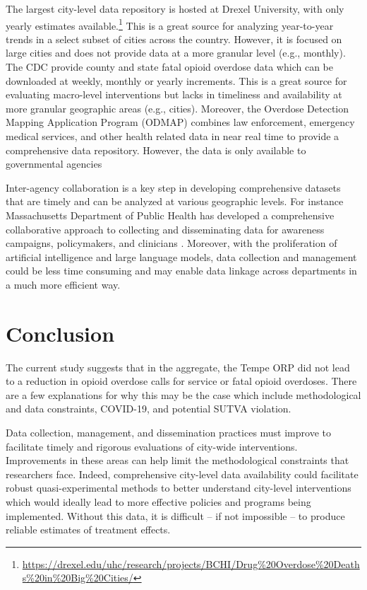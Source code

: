 The largest city-level data repository is hosted at Drexel University, with only yearly estimates available.\footnote{\url{https://drexel.edu/uhc/research/projects/BCHI/Drug\%20Overdose\%20Deaths\%20in\%20Big\%20Cities/}} This is a great source for analyzing year-to-year trends in a select subset of cities across the country. However, it is focused on large cities and does not provide data at a more granular level (e.g., monthly). The CDC provide county and state fatal opioid overdose data which can be downloaded at weekly, monthly or yearly increments. This is a great source for evaluating macro-level interventions but lacks in timeliness and availability at more granular geographic areas (e.g., cities). Moreover, the Overdose Detection Mapping Application Program (ODMAP) combines law enforcement, emergency medical services, and other health related data in near real time to provide a comprehensive data repository. However, the data is only available to governmental agencies \parencite{blanco_data_2022}

Inter-agency collaboration is a key step in developing comprehensive datasets that are timely and can be analyzed at various geographic levels. For instance Massachusetts Department of Public Health has developed a comprehensive collaborative approach to collecting and disseminating data for awareness campaigns, policymakers, and clinicians \parencite{bharel_using_2020}. Moreover, with the proliferation of artificial intelligence and large language models, data collection and management could be less time consuming and may enable data linkage across departments in a much more efficient way. 

\section{\centering Conclusion}
The current study suggests that in the aggregate, the Tempe ORP did not lead to a reduction in opioid overdose calls for service or fatal opioid overdoses. There are a few explanations for why this may be the case which include methodological and data constraints, COVID-19, and potential SUTVA violation. 

Data collection, management, and dissemination practices must improve to facilitate timely and rigorous evaluations of city-wide interventions. Improvements in these areas can help limit the methodological constraints that researchers face. Indeed, comprehensive city-level data availability could facilitate robust quasi-experimental methods to better understand city-level interventions which would ideally lead to more effective policies and programs being implemented. Without this data, it is difficult -- if not impossible -- to produce reliable estimates of treatment effects.

